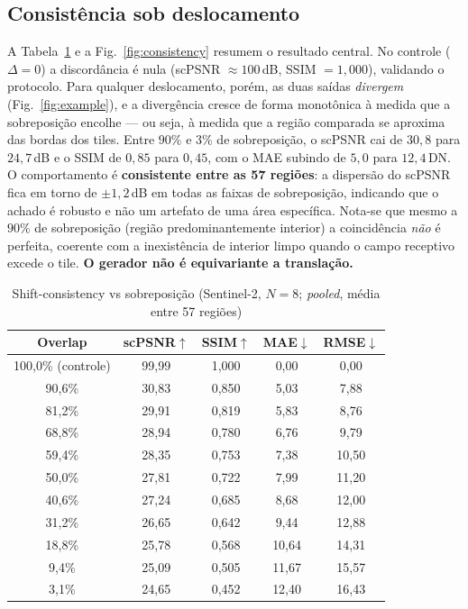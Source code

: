 \documentclass[conference]{IEEEtran}
\begin{document}
\subsection{Consistência sob deslocamento}
A Tabela~\ref{tab:consistency} e a Fig.~\ref{fig:consistency} resumem o resultado
central. No controle ($\Delta=0$) a discordância é nula (scPSNR $\approx 100$\,dB,
SSIM $=1{,}000$), validando o protocolo. Para qualquer deslocamento, porém, as duas
saídas \emph{divergem} (Fig.~\ref{fig:example}), e a divergência cresce de forma monotônica à medida que a
sobreposição encolhe --- ou seja, à medida que a região comparada se aproxima das
bordas dos tiles. Entre $90\%$ e $3\%$ de sobreposição, o scPSNR cai de $30{,}8$ para
$24{,}7$\,dB e o SSIM de $0{,}85$ para $0{,}45$, com o MAE subindo de $5{,}0$ para
$12{,}4$\,DN. O comportamento é \textbf{consistente entre as 57 regiões}: a dispersão do
scPSNR fica em torno de $\pm1{,}2$\,dB em todas as faixas de sobreposição, indicando que
o achado é robusto e não um artefato de uma área específica. Nota-se que mesmo a $90\%$
de sobreposição (região predominantemente interior) a coincidência \emph{não} é perfeita,
coerente com a inexistência de interior limpo quando o campo receptivo excede o tile.
\textbf{O gerador não é equivariante a translação.}

\begin{table}[htbp]
\caption{Shift-consistency vs sobreposição (Sentinel-2, $N=8$; \emph{pooled}, média entre 57 regiões)}
\label{tab:consistency}
\begin{center}
\begin{tabular}{ccccc}
\toprule
\textbf{Overlap} & \textbf{scPSNR}$\uparrow$ & \textbf{SSIM}$\uparrow$ & \textbf{MAE}$\downarrow$ & \textbf{RMSE}$\downarrow$ \\
\midrule
100,0\% (controle) & 99,99 & 1,000 & 0,00 & 0,00 \\
90,6\% & 30,83 & 0,850 & 5,03 & 7,88 \\
81,2\% & 29,91 & 0,819 & 5,83 & 8,76 \\
68,8\% & 28,94 & 0,780 & 6,76 & 9,79 \\
59,4\% & 28,35 & 0,753 & 7,38 & 10,50 \\
50,0\% & 27,81 & 0,722 & 7,99 & 11,20 \\
40,6\% & 27,24 & 0,685 & 8,68 & 12,00 \\
31,2\% & 26,65 & 0,642 & 9,44 & 12,88 \\
18,8\% & 25,78 & 0,568 & 10,64 & 14,31 \\
9,4\% & 25,09 & 0,505 & 11,67 & 15,57 \\
3,1\% & 24,65 & 0,452 & 12,40 & 16,43 \\
\bottomrule
\end{tabular}
\end{center}
\end{table}
\end{document}
